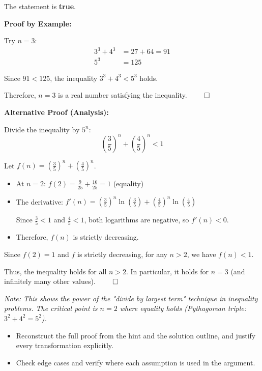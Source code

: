\begin{solution}
The statement is \textbf{true}.

\vspace{0.3cm}

\textbf{Proof by Example:}

Try $n = 3$:
\begin{align*}
3^3 + 4^3 &= 27 + 64 = 91 \\
5^3 &= 125
\end{align*}

Since $91 < 125$, the inequality $3^3 + 4^3 < 5^3$ holds.

Therefore, $n = 3$ is a real number satisfying the inequality. $\qed$

\vspace{0.5cm}

\textbf{Alternative Proof (Analysis):}

Divide the inequality by $5^n$:
\[
\left(\frac{3}{5}\right)^n + \left(\frac{4}{5}\right)^n < 1
\]

Let $f(n) = \left(\frac{3}{5}\right)^n + \left(\frac{4}{5}\right)^n$.

\begin{itemize}
\item At $n = 2$: $f(2) = \frac{9}{25} + \frac{16}{25} = 1$ (equality)
\item The derivative: $f'(n) = \left(\frac{3}{5}\right)^n \ln\left(\frac{3}{5}\right) + \left(\frac{4}{5}\right)^n \ln\left(\frac{4}{5}\right)$

Since $\frac{3}{5} < 1$ and $\frac{4}{5} < 1$, both logarithms are negative, so $f'(n) < 0$.

\item Therefore, $f(n)$ is strictly decreasing.
\end{itemize}

Since $f(2) = 1$ and $f$ is strictly decreasing, for any $n > 2$, we have $f(n) < 1$.

Thus, the inequality holds for all $n > 2$. In particular, it holds for $n = 3$ (and infinitely many other values). $\qed$

\vspace{0.3cm}

\textit{Note: This shows the power of the "divide by largest term" technique in inequality problems. The critical point is $n = 2$ where equality holds (Pythagorean triple: $3^2 + 4^2 = 5^2$).}
\end{solution}

\begin{takeaways}
\begin{itemize}[leftmargin=*]
\item Reconstruct the full proof from the hint and the solution outline, and justify every transformation explicitly.
\item Check edge cases and verify where each assumption is used in the argument.
\end{itemize}
\end{takeaways}
